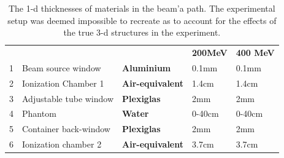  \begin{table}[h]
\begin{tabular}{lllll} %
 & & & \textbf{200MeV} & \textbf{400 MeV} \\
1&Beam source window &\textbf{Aluminium}&0.1mm& 0.1mm\\
2&Ionization Chamber 1 &\textbf{Air-equivalent}&1.4cm& 1.4cm\\
3&Adjustable tube window &\textbf{Plexiglas}&2mm&2mm\\
4&Phantom &\textbf{Water}&0-40cm& 0-40cm\\
5&Container back-window &\textbf{Plexiglas}&2mm&2mm\\
6&Ionization chamber 2&\textbf{Air-equivalent}&3.7cm& 3.7cm\\
\end{tabular} 
\caption{\label{fig:SimSetup} The 1-d thicknesses of materials in the beam'a path. The experimental setup was deemed impossible to recreate as to account for the effects of the true 3-d structures in the experiment.}
\end{table}





